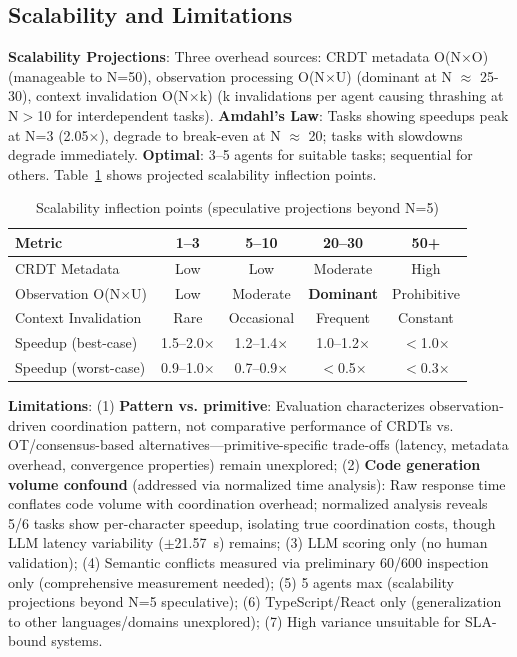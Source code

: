 \documentclass{article}
\begin{document}
\subsection{Scalability and Limitations}

\textbf{Scalability Projections}: Three overhead sources: CRDT metadata O(N$\times$O) (manageable to N=50), observation processing O(N$\times$U) (dominant at N $\approx$ 25-30), context invalidation O(N$\times$k) (k invalidations per agent causing thrashing at N$>$10 for interdependent tasks). \textbf{Amdahl's Law}: Tasks showing speedups peak at N=3 (2.05$\times$), degrade to break-even at N $\approx$ 20; tasks with slowdowns degrade immediately. \textbf{Optimal}: 3--5 agents for suitable tasks; sequential for others. Table~\ref{tab:scalability} shows projected scalability inflection points.

\begin{table}[t]
\caption{Scalability inflection points (speculative projections beyond N=5)}
\label{tab:scalability}
\vskip 0.15in
\centering
\small
\begin{tabular}{lcccc}
\toprule
\textbf{Metric} & \textbf{1--3} & \textbf{5--10} & \textbf{20--30} & \textbf{50+} \\
\midrule
CRDT Metadata & Low & Low & Moderate & High \\
Observation O(N$\times$U) & Low & Moderate & \textbf{Dominant} & Prohibitive \\
Context Invalidation & Rare & Occasional & Frequent & Constant \\
Speedup (best-case) & 1.5--2.0$\times$ & 1.2--1.4$\times$ & 1.0--1.2$\times$ & $<$1.0$\times$ \\
Speedup (worst-case) & 0.9--1.0$\times$ & 0.7--0.9$\times$ & $<$0.5$\times$ & $<$0.3$\times$ \\
\bottomrule
\end{tabular}
\end{table}

\textbf{Limitations}: (1) \textbf{Pattern vs. primitive}: Evaluation characterizes observation-driven coordination pattern, not comparative performance of CRDTs vs. OT/consensus-based alternatives---primitive-specific trade-offs (latency, metadata overhead, convergence properties) remain unexplored; (2) \textbf{Code generation volume confound} (addressed via normalized time analysis): Raw response time conflates code volume with coordination overhead; normalized analysis reveals 5/6 tasks show per-character speedup, isolating true coordination costs, though LLM latency variability ($\pm$21.57~s) remains; (3) LLM scoring only (no human validation); (4) Semantic conflicts measured via preliminary 60/600 inspection only (comprehensive measurement needed); (5) 5 agents max (scalability projections beyond N=5 speculative); (6) TypeScript/React only (generalization to other languages/domains unexplored); (7) High variance unsuitable for SLA-bound systems.
\end{document}
